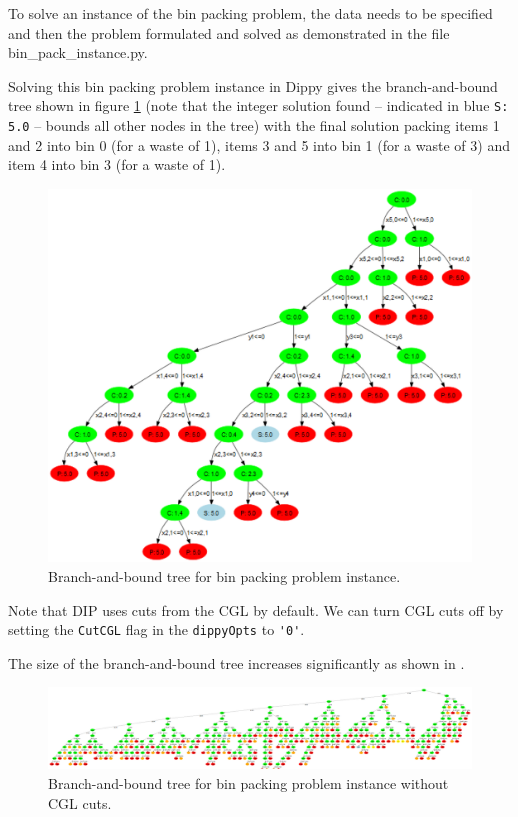 To solve an instance of the bin packing problem, the data needs to be specified and then the problem formulated and solved as demonstrated in the file bin\_pack\_instance.py.


Solving this bin packing problem instance in Dippy gives the branch-and-bound tree shown in figure \ref{fig:bpp_tree1} (note that the integer solution found -- indicated in blue \lstinline{S: 5.0} -- bounds all other nodes in the tree) with the final solution packing items 1 and 2 into bin 0 (for a waste of 1), items 3 and 5 into bin 1 (for a waste of 3) and item 4 into bin 3 (for a waste of 1).
\begin{figure}[htp]
\begin{center}
\includegraphics[scale=0.16]{img/bpp_tree1.eps}
\end{center}
\caption{Branch-and-bound tree for bin packing problem instance.} \label{fig:bpp_tree1}
\end{figure}

\newpage
Note that \ac{DIP} uses cuts from the \ac{CGL} \cite{coin_or} by default. We can turn \ac{CGL} cuts off by setting the {\tt CutCGL} flag in the \lstinline{dippyOpts} to \lstinline{'0'}.

The size of the branch-and-bound tree increases significantly  as shown in .
\begin{figure}[htp]
\begin{center}
\includegraphics[scale=0.08]{img/bpp_tree4.eps}
\end{center}
\caption{Branch-and-bound tree for bin packing problem instance without \ac{CGL} cuts.} \label{fig:bpp_tree4}
\end{figure}



